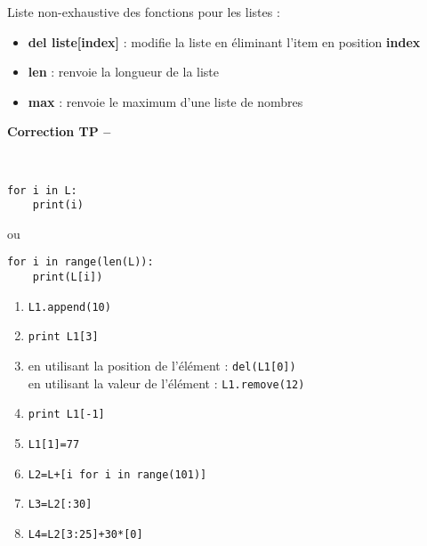 Liste non-exhaustive des fonctions pour les listes :
\begin{itemize}
\item \textbf{del liste[index]} : modifie la liste en \' eliminant l'item en position \textbf{index}
\item \textbf{len} : renvoie la longueur de la liste
\item \textbf{max} : renvoie le maximum d'une liste de nombres
\end{itemize}














\ifdef{\public}{}{}

\newpage 

\begin{center}
{\Large\bf Correction TP \no {\num} -- \descrip}
\end{center}



\begin{solution}~\\
\vspace{-0.7cm}
\begin{verbatim}
for i in L:
    print(i)
\end{verbatim}
ou 
\begin{verbatim}
for i in range(len(L)):
	print(L[i])
\end{verbatim}
\end{solution}



\begin{solution}
\begin{enumerate}
\item \verb?L1.append(10)?
\item \verb?print L1[3]?
\item en utilisant la position de l'\' el\' ement : \verb?del(L1[0])? \\
en utilisant la valeur de l'\' el\' ement : \verb?L1.remove(12)?
\item \verb?print L1[-1]?
\item \verb?L1[1]=77?
\item \verb?L2=L+[i for i in range(101)]?
\item \verb?L3=L2[:30]?
\item \verb?L4=L2[3:25]+30*[0]?
\end{enumerate}
\end{solution}




